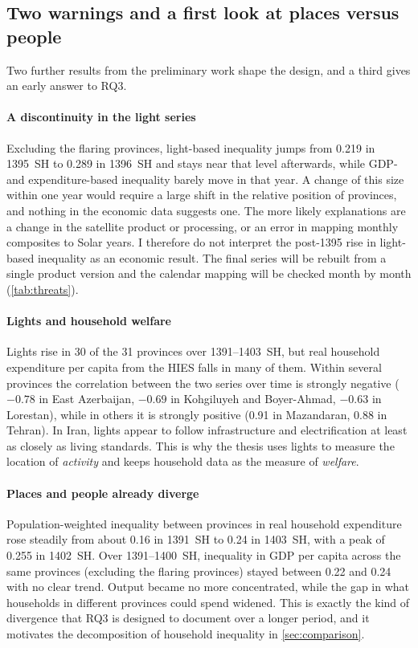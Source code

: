 \documentclass[11pt,a4paper]{article}
\begin{document}
\subsection{Two warnings and a first look at places versus people}\label{sec:prelimwarn}

Two further results from the preliminary work shape the design, and a third gives an early answer to RQ3.

\paragraph{A discontinuity in the light series}
Excluding the flaring provinces, light-based inequality jumps from 0.219 in 1395~SH to 0.289 in 1396~SH and stays near that level afterwards, while GDP- and expenditure-based inequality barely move in that year. A change of this size within one year would require a large shift in the relative position of provinces, and nothing in the economic data suggests one. The more likely explanations are a change in the satellite product or processing, or an error in mapping monthly composites to Solar years. I therefore do not interpret the post-1395 rise in light-based inequality as an economic result. The final series will be rebuilt from a single product version and the calendar mapping will be checked month by month (\cref{tab:threats}).

\paragraph{Lights and household welfare}
Lights rise in 30 of the 31 provinces over 1391--1403~SH, but real household expenditure per capita from the HIES falls in many of them. Within several provinces the correlation between the two series over time is strongly negative ($-0.78$ in East Azerbaijan, $-0.69$ in Kohgiluyeh and Boyer-Ahmad, $-0.63$ in Lorestan), while in others it is strongly positive (0.91 in Mazandaran, 0.88 in Tehran). In Iran, lights appear to follow infrastructure and electrification at least as closely as living standards. This is why the thesis uses lights to measure the location of \emph{activity} and keeps household data as the measure of \emph{welfare}.

\paragraph{Places and people already diverge}
Population-weighted inequality between provinces in real household expenditure rose steadily from about 0.16 in 1391~SH to 0.24 in 1403~SH, with a peak of 0.255 in 1402~SH. Over 1391--1400~SH, inequality in GDP per capita across the same provinces (excluding the flaring provinces) stayed between 0.22 and 0.24 with no clear trend. Output became no more concentrated, while the gap in what households in different provinces could spend widened. This is exactly the kind of divergence that RQ3 is designed to document over a longer period, and it motivates the decomposition of household inequality in \cref{sec:comparison}.
\end{document}
